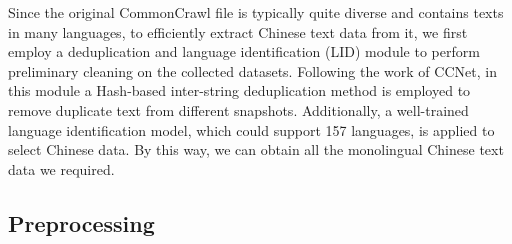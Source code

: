 \documentclass{article}
\begin{document}
Since the original CommonCrawl file is typically quite diverse and contains texts in many languages, to efficiently extract Chinese text data from it, we first employ a deduplication and language identification (LID) module to perform preliminary cleaning on the collected datasets. Following the work of CCNet\cite{wenzek_ccnet_2020}, in this module a Hash-based inter-string deduplication method is employed to remove duplicate text from different snapshots. Additionally, a well-trained language identification model\cite{grave2018learning}, which could support 157 languages, is applied to select Chinese data. By this way, we can obtain all the monolingual Chinese text data we required. 

\subsection{Preprocessing}
\end{document}
